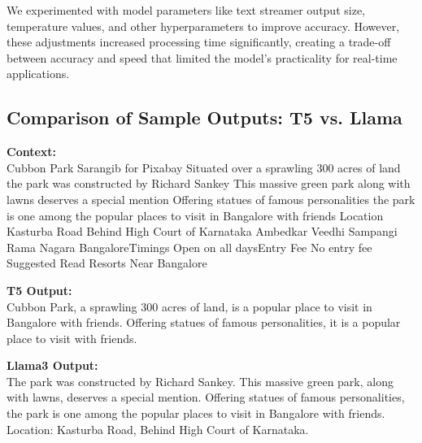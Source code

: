 \documentclass[conference]{IEEEtran}
\begin{document}
We experimented with model parameters like text streamer output size, temperature values, and other hyperparameters to improve accuracy. However, these adjustments increased processing time significantly, creating a trade-off between accuracy and speed that limited the model's practicality for real-time applications.


    \subsection{Comparison of Sample Outputs: T5 vs. Llama}

    \begin{tcolorbox}[linewidth=1pt, innerleftmargin=15pt, innerrightmargin=15pt, innertopmargin=15pt, innerbottommargin=15pt]
        \textbf{Context:} \\

        Cubbon Park Sarangib for Pixabay Situated over a sprawling 300 acres of land the park was constructed by Richard Sankey This massive green park along with lawns deserves a special mention Offering statues of famous personalities the park is one among the popular places to visit in Bangalore with friends Location Kasturba Road Behind High Court of Karnataka Ambedkar Veedhi Sampangi Rama Nagara BangaloreTimings Open on all daysEntry Fee No entry fee Suggested Read Resorts Near Bangalore
    \end{tcolorbox}


    \begin{tcolorbox}[linewidth=1pt, innerleftmargin=15pt, innerrightmargin=15pt, innertopmargin=15pt, innerbottommargin=15pt]
        \textbf{T5 Output:} \\

        Cubbon Park, a sprawling 300 acres of land, is a popular place to visit in Bangalore with friends. Offering statues of famous personalities, it is a popular place to visit with friends.
    \end{tcolorbox}

    \begin{tcolorbox}[linewidth=1pt, innerleftmargin=15pt, innerrightmargin=15pt, innertopmargin=15pt, innerbottommargin=15pt]
        \textbf{Llama3 Output:} \\

        The park was constructed by Richard Sankey. This massive green park, along with lawns, deserves a special mention. Offering statues of famous personalities, the park is one among the popular places to visit in Bangalore with friends. Location: Kasturba Road, Behind High Court of Karnataka.
    \end{tcolorbox}
\end{document}
